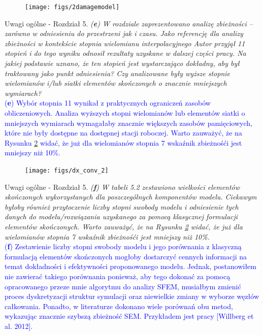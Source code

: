 \documentclass[10pt,aspectratio=169]{beamer} %
\begin{document}
\begin{frame}
\begin{figure}
	\centering
	\texttt{[image: figs/2damagemodel]}
	\label{fig:2damagemodel}
\end{figure}
\end{frame}

\begin{frame}[label=frame17]{Uwagi ogólne - Rozdział 5.}\justifying
\textit{(\textbf{e}) W rozdziale zaprezentowano analizę zbieżności – zarówno w odniesieniu do przestrzeni jak i czasu. Jako referencję dla analizy zbieżności w kontekście stopnia wielomianu interpolacyjnego Autor przyjął 11 stopień i do tego wyniku odnosił rezultaty uzyskane w dalszej części pracy. Na jakiej podstawie uznano, że ten stopień jest wystarczająco dokładny, aby był traktowany jako punkt odniesienia? Czy analizowane były wyższe stopnie wielomianów i/lub siatki elementów skończonych o znacznie mniejszych wymiarach?}\\
\textcolor{blue}{(\textbf{e}) Wybór stopnia 11 wynikał z praktycznych ograniczeń zasobów obliczeniowych. Analiza wyższych stopni wielomianów lub elementów siatki o mniejszych wymiarach wymagałaby znacznie większych zasobów pamięciowych, które nie były dostępne na dostępnej stacji roboczej. Warto zauważyć, że na Rysunku \ref{fig:dx_conv_2} widać, że już dla wielomianów stopnia 7 wskaźnik zbieżnośći jest mniejszy niż 10\%.}
\end{frame}
\begin{frame}
\begin{figure}
	\centering
	\texttt{[image: figs/dx\_conv\_2]}
	\label{fig:dx_conv_2}
\end{figure}
\end{frame}
\begin{frame}[label=frame18]{Uwagi ogólne - Rozdział 5.}\justifying
\textit{(\textbf{f}) W tabeli 5.2 zestawiono wielkości elementów skończonych wykorzystanych dla poszczególnych komponentów modelu. Ciekawym byłoby również przytoczenie liczby stopni swobody modelu i odniesienie tych danych do modelu/rozwiązania uzyskanego za pomocą klasycznej formulacji elementów skończonych. Warto zauważyć, że na Rysunku \ref{fig:dx_conv_2} widać, że już dla wielomianów stopnia 7 wskaźnik zbieżnośći jest mniejszy niż 10\%. }\\
\textcolor{blue}{(\textbf{f}) Zestawienie liczby stopni swobody modelu i jego porównania z klasyczną formulacją elementów skończonych mogłoby dostarczyć cennych informacji na temat dokładności i efektywności proponowanego modelu. Jednak, postanowiłem nie zawierać takiego porównania ponieważ, aby tego dokonać za pomocą opracowanego przeze mnie algorytmu do analizy SFEM, musiałbym zmienić proces dyskretyzacji struktur symulacji oraz niewielkie zmiany w wyborze węzłów całkowania. Ponadto, w literaturze dokonano wiele porównań obu metod, wykazując znacznie szybszą zbieżność SEM. Przykładem jest pracy [Willberg et al. 2012].}
\end{frame}
\end{document}
